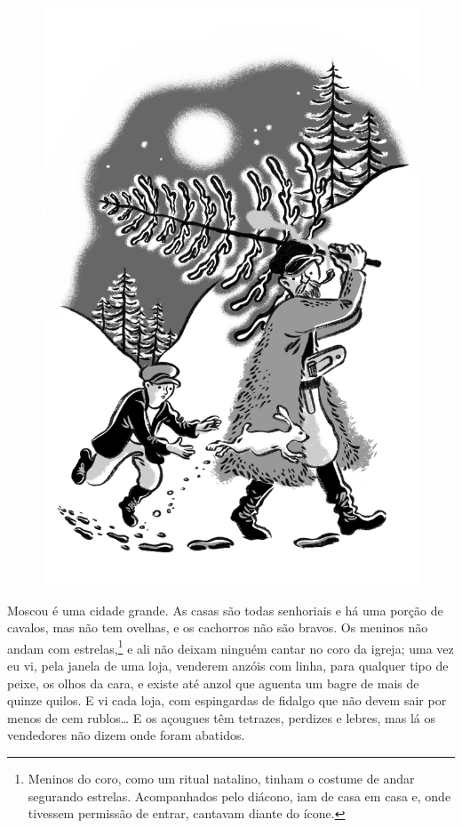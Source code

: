 \begin{figure}%
\vspace*{-1.6cm}
\hspace*{-1.8cm}\includegraphics{./imgs/cena6.jpg}
\end{figure}

Moscou é uma cidade grande. As casas são todas senhoriais e há uma
porção de cavalos, mas não tem ovelhas, e os cachorros não são bravos.
Os meninos não andam com estrelas,\footnote{Meninos do coro, como um
  ritual natalino, tinham o costume de andar segurando estrelas.
  Acompanhados pelo diácono, iam de casa em casa e, onde tivessem
  permissão de entrar, cantavam diante do ícone.} e ali não deixam
ninguém cantar no coro da igreja; uma vez eu vi, pela janela de uma
loja, venderem anzóis com linha, para qualquer tipo de peixe, os olhos
da cara, e existe até anzol que aguenta um bagre de mais de quinze
quilos. E vi cada loja, com espingardas de fidalgo que não devem
sair por menos de cem rublos\ldots{} E os açougues têm tetrazes, perdizes e
lebres, mas lá os vendedores não dizem onde foram abatidos.

